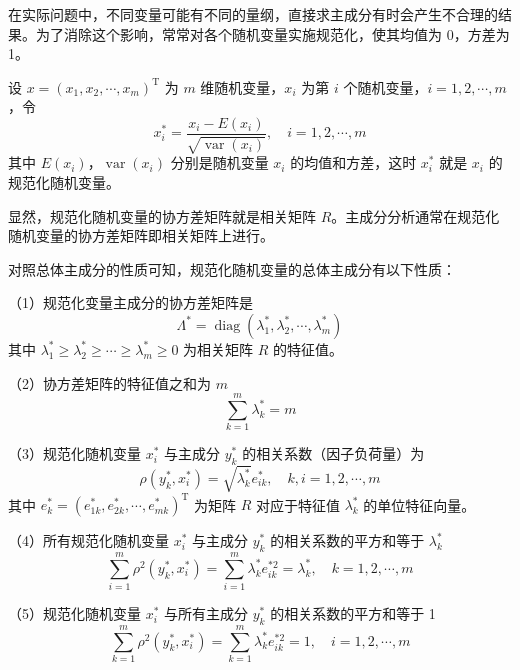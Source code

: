 \documentclass[UTF8, 12pt, fontset=fandol, oneside]{ctexart}
\begin{document}
在实际问题中，不同变量可能有不同的量纲，直接求主成分有时会产生不合理的结果。为了消除这个影响，常常对各个随机变量实施规范化，使其均值为 0，方差为 1。

设 $x=(x_1,x_2,\cdots,x_m)^{\mathrm{T}}$ 为 $m$ 维随机变量，$x_i$ 为第 $i$ 个随机变量，$i=1,2,\cdots,m$，令
\begin{equation}
x_i^*=\frac{x_i-E(x_i)}{\sqrt{\operatorname{var}(x_i)}},\quad i=1,2,\cdots,m
\tag{16.33}
\end{equation}
其中 $E(x_i)$，$\operatorname{var}(x_i)$ 分别是随机变量 $x_i$ 的均值和方差，这时 $x_i^*$ 就是 $x_i$ 的规范化随机变量。

显然，规范化随机变量的协方差矩阵就是相关矩阵 $R$。主成分分析通常在规范化随机变量的协方差矩阵即相关矩阵上进行。

对照总体主成分的性质可知，规范化随机变量的总体主成分有以下性质：

（1）规范化变量主成分的协方差矩阵是
\begin{equation}
\Lambda^*=\operatorname{diag}(\lambda_1^*,\lambda_2^*,\cdots,\lambda_m^*)
\tag{16.34}
\end{equation}
其中 $\lambda_1^*\geqslant\lambda_2^*\geqslant\cdots\geqslant\lambda_m^*\geqslant 0$ 为相关矩阵 $R$ 的特征值。

（2）协方差矩阵的特征值之和为 $m$
\begin{equation}
\sum_{k=1}^m\lambda_k^*=m
\tag{16.35}
\end{equation}

（3）规范化随机变量 $x_i^*$ 与主成分 $y_k^*$ 的相关系数（因子负荷量）为
\begin{equation}
\rho(y_k^*,x_i^*)=\sqrt{\lambda_k^*}e_{ik}^*,\quad k,i=1,2,\cdots,m
\tag{16.36}
\end{equation}
其中 $e_k^*=(e_{1k}^*,e_{2k}^*,\cdots,e_{mk}^*)^{\mathrm{T}}$ 为矩阵 $R$ 对应于特征值 $\lambda_k^*$ 的单位特征向量。

（4）所有规范化随机变量 $x_i^*$ 与主成分 $y_k^*$ 的相关系数的平方和等于 $\lambda_k^*$
\begin{equation}
\sum_{i=1}^m\rho^2(y_k^*,x_i^*)=\sum_{i=1}^m\lambda_k^*e_{ik}^{*2}=\lambda_k^*,\quad k=1,2,\cdots,m
\tag{16.37}
\end{equation}

（5）规范化随机变量 $x_i^*$ 与所有主成分 $y_k^*$ 的相关系数的平方和等于 1
\begin{equation}
\sum_{k=1}^m\rho^2(y_k^*,x_i^*)=\sum_{k=1}^m\lambda_k^*e_{ik}^{*2}=1,\quad i=1,2,\cdots,m
\tag{16.38}
\end{equation}
\end{document}
